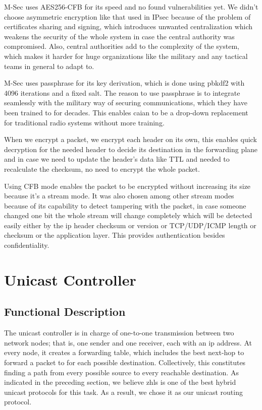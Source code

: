 M-Sec uses AES256-CFB for its speed and no found vulnerabilities yet.
We didn't choose asymmetric encryption like that used in IPsec because of the problem of certificates sharing and signing, which introduces unwanted centralization which weakens the security of the whole system in case the central authority was compromised.
Also, central authorities add to the complexity of the system, which makes it harder for huge organizations like the military and any tactical teams in general to adapt to.

M-Sec uses passphrase for its key derivation, which is done using pbkdf2 with 4096 iterations and a fixed salt.
The reason to use passphrase is to integrate seamlessly with the military way of securing communications, which they have been trained to for decades.
This enables \acrshort{caian} to be a drop-down replacement for traditional radio systems without more training.

When we encrypt a packet, we encrypt each header on its own, this enables quick decryption for the needed header to decide its destination in the forwarding plane and in case we need to update the header's data like TTL and needed to recalculate the checksum, no need to encrypt the whole packet.

Using CFB mode enables the packet to be encrypted without increasing its size because it's a stream mode.
It was also chosen among other stream modes because of its capability to detect tampering with the packet, in case someone changed one bit the whole stream will change completely which will be detected easily either by the \acrshort{ip} header checksum or version or TCP/UDP/ICMP length or checksum or the application layer.
This provides authentication besides confidentiality.

\section{Unicast Controller}
\subsection{Functional Description}
The unicast controller is in charge of one-to-one transmission between two network nodes; that is, one sender and one receiver, each with an \acrshort{ip} address. At every node, it creates a forwarding table, which includes the best next-hop to forward a packet to for each possible destination. Collectively, this constitutes finding a path from every possible source to every reachable destination. As indicated in the preceding section, we believe \acrfull{zhls} is one of the best hybrid unicast protocols for this task. As a result, we chose it as our unicast routing protocol.

